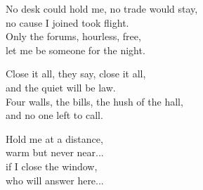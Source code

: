 \begin{lyrics}
No desk could hold me, no trade would stay,\\
no cause I joined took flight.\\
Only the forums, hourless, free,\\
let me be someone for the night.

Close it all, they say, close it all,\\
and the quiet will be law.\\
Four walls, the bills, the hush of the hall,\\
and no one left to call.

Hold me at a distance,\\
warm but never near...\\
if I close the window,\\
who will answer here...
\end{lyrics}

